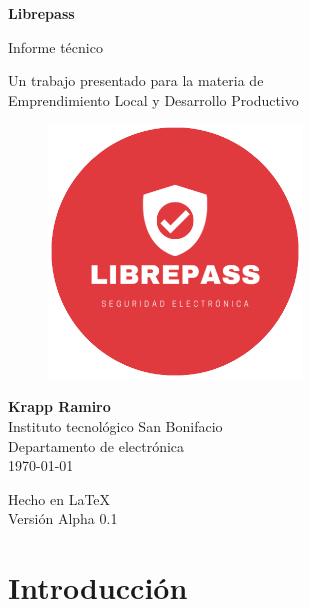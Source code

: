 \documentclass{article}
\begin{document}
\begin{titlepage}
	\begin{center}
		\vspace{1cm}

		{\Huge
			\textbf{Librepass}}

		\vspace{0.3cm}
		{\LARGE
			Informe técnico}

		\vspace{0.5cm}
		{\Large
			Un trabajo presentado para la materia de \\
			Emprendimiento Local y Desarrollo Productivo}

		\vspace{2cm}

		\begin{figure}[H]
			\centering
			\includegraphics[width=0.6\textwidth]{logo.png}
		\end{figure}

		\vfill

		{\Large
			\textbf{Krapp Ramiro} \\
			\vspace{0.5cm}
			Instituto tecnológico San Bonifacio\\
			Departamento de electrónica\\
			\today
		}

		\vspace{0.5cm}
		{\large Hecho en {\LaTeX}\\
			Versión Alpha 0.1}

	\end{center}
\end{titlepage}

\section{Introducción}
%
\end{document}
